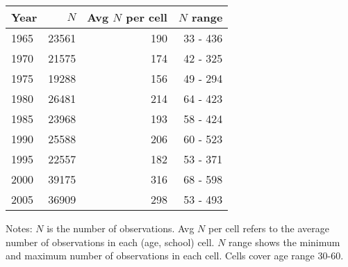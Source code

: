 \begin{tabular}{lrrr}
\hline
Year & $N$  & Avg $N$ per cell  & $N$ range  \\ 
\hline
1965 & 23561  & 190  & 33 - 436  \\ 
1970 & 21575  & 174  & 42 - 325  \\ 
1975 & 19288  & 156  & 49 - 294  \\ 
1980 & 26481  & 214  & 64 - 423  \\ 
1985 & 23968  & 193  & 58 - 424  \\ 
1990 & 25588  & 206  & 60 - 523  \\ 
1995 & 22557  & 182  & 53 - 371  \\ 
2000 & 39175  & 316  & 68 - 598  \\ 
2005 & 36909  & 298  & 53 - 493  \\ 
\hline
\end{tabular}%

 \vspace{5 mm} 
\small 
Notes: $N$ is the number of observations. 
Avg $N$ per cell refers to the average number of observations in each (age, school) cell. 
$N$ range shows the minimum and maximum number of observations in each cell. 
Cells cover age range 30-60.
\normalsize 
